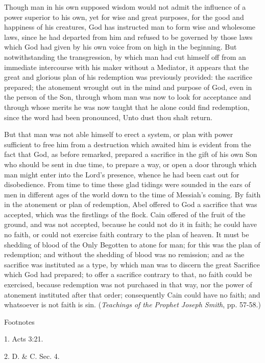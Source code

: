 Though man in his own supposed wisdom would not admit the influence of a power superior
to his own, yet for wise and great purposes, for the good and happiness of his creatures, God
has instructed man to form wise and wholesome laws, since he had departed from him and
refused to be governed by those laws which God had given by his own voice from on high in
the beginning. But notwithstanding the transgression, by which man had cut himself off from
an immediate intercourse with his maker without a Mediator, it appears that the great and
glorious plan of his redemption was previously provided: the sacrifice prepared; the
atonement wrought out in the mind and purpose of God, even in the person of the Son,
through whom man was now to look for acceptance and through whose merits he was now
taught that he alone could find redemption, since the word had been pronounced, Unto dust
thou shalt return.

But that man was not able himself to erect a system, or plan with power sufficient to free him
from a destruction which awaited him is evident from the fact that God, as before remarked,
prepared a sacrifice in the gift of his own Son who should be sent in due time, to prepare a
way, or open a door through which man might enter into the Lord's presence, whence he had
been cast out for disobedience. From time to time these glad tidings were sounded in the ears
of men in different ages of the world down to the time of Messiah's coming. By faith in the
atonement or plan of redemption, Abel offered to God a sacrifice that was accepted, which
was the firstlings of the flock. Cain offered of the fruit of the ground, and was not accepted,
because he could not do it in faith; he could have no faith, or could not exercise faith contrary
to the plan of heaven. It must be shedding of blood of the Only Begotten to atone for man;
for this was the plan of redemption; and without the shedding of blood was no remission; and
as the sacrifice was instituted as a type, by which man was to discern the great Sacrifice
which God had prepared; to offer a sacrifice contrary to that, no faith could be exercised,
because redemption was not purchased in that way, nor the power of atonement instituted
after that order; consequently Cain could have no faith; and whatsoever is not faith is sin.
(\textit{Teachings of the Prophet Joseph Smith}, pp. 57-58.)

\newpage
Footnotes

1. Acts 3:21.

2. D. \& C. Sec. 4.

